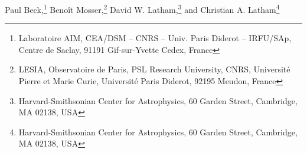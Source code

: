 \setcounter{footnote}{3}
Paul Beck,\footnote{Laboratoire AIM, CEA/DSM – CNRS – Univ. Paris Diderot – IRFU/SAp, Centre de Saclay, 91191 Gif-sur-Yvette Cedex, France}
\setcounter{footnote}{6}
Beno\^it Mosser,\footnote{LESIA, Observatoire de Paris, PSL Research University, CNRS, Universit\'e Pierre et Marie Curie, Universit\'e Paris Diderot, 92195 Meudon, France}
David W. Latham,\footnote{Harvard-Smithsonian Center for Astrophysics, 60 Garden Street, Cambridge, MA 02138, USA}
and
\setcounter{footnote}{7}
Christian A. Latham\footnote{Harvard-Smithsonian Center for Astrophysics, 60 Garden Street, Cambridge, MA 02138, USA}